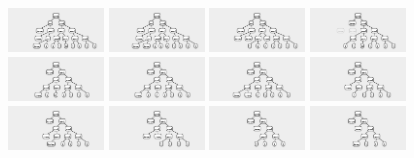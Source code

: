 \documentclass{article}
\begin{document}
\begin{figure}
\begin{center}
\includegraphics[width=1in]{../board/pics/ss751.png}
\includegraphics[width=1in]{../board/pics/ss801.png}
\includegraphics[width=1in]{../board/pics/ss851.png}
\includegraphics[width=1in]{../board/pics/ss901.png}
\includegraphics[width=1in]{../board/pics/ss951.png}
\includegraphics[width=1in]{../board/pics/ss1001.png}
\includegraphics[width=1in]{../board/pics/ss1051.png}
\includegraphics[width=1in]{../board/pics/ss1101.png}
\includegraphics[width=1in]{../board/pics/ss1151.png}
\includegraphics[width=1in]{../board/pics/ss1201.png}
\includegraphics[width=1in]{../board/pics/ss1251.png}
\includegraphics[width=1in]{../board/pics/ss1301.png}

\end{center}
\end{figure}
\end{document}
